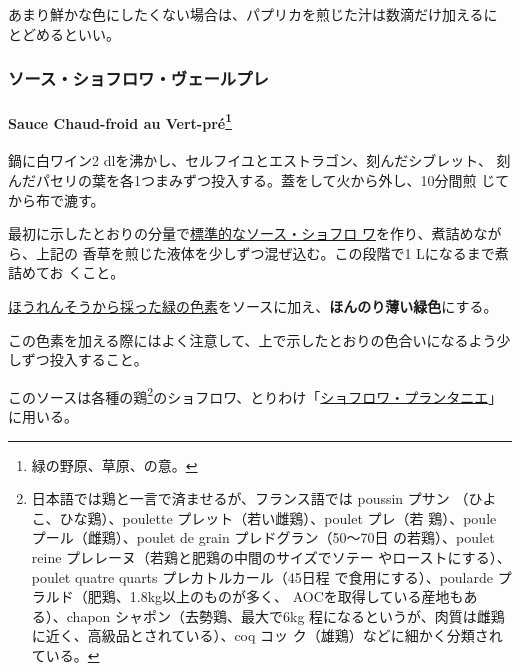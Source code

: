 \begin{recette}
あまり鮮かな色にしたくない場合は、パプリカを煎じた汁は数滴だけ加えるに
とどめるといい。

\maeaki

\hypertarget{ux30bdux30fcux30b9ux30b7ux30e7ux30d5ux30edux30efux30f4ux30a7ux30fcux30ebux30d7ux30ec}{%
\subsubsection{ソース・ショフロワ・ヴェールプレ}\label{ux30bdux30fcux30b9ux30b7ux30e7ux30d5ux30edux30efux30f4ux30a7ux30fcux30ebux30d7ux30ec}}

\hypertarget{sauce-choud-froid-vert-pre}{%
\paragraph[Sauce Chaud-froid au Vert-pré]{\texorpdfstring{Sauce
Chaud-froid au Vert-pré\footnote{緑の野原、草原、の意。}}{Sauce Chaud-froid au Vert-pré}}\label{sauce-choud-froid-vert-pre}}


鍋に白ワイン2 dlを沸かし、セルフイユとエストラゴン、刻んだシブレット、
刻んだパセリの葉を各1つまみずつ投入する。蓋をして火から外し、10分間煎
じてから布で漉す。

最初に示したとおりの分量で\protect\hyperlink{sauce-chaud-froid-blanche-ordinaire}{標準的なソース・ショフロ
ワ}を作り、煮詰めながら、上記の
香草を煎じた液体を少しずつ混ぜ込む。この段階で1 Lになるまで煮詰めてお
くこと。

\protect\hyperlink{}{ほうれんそうから採った緑の色素}をソースに加え、\textbf{ほんのり薄い緑色}にする。

この色素を加える際にはよく注意して、上で示したとおりの色合いになるよう少しずつ投入すること。

このソースは各種の鶏\footnote{日本語では鶏と一言で済ませるが、フランス語では
  poussin プサン （ひよこ、ひな鶏）、poulette
  プレット（若い雌鶏）、poulet プレ（若 鶏）、poule
  プール（雌鶏）、poulet de grain プレドグラン（50〜70日
  の若鶏）、poulet reine プレレーヌ（若鶏と肥鶏の中間のサイズでソテー
  やローストにする）、poulet quatre quarts プレカトルカール（45日程
  で食用にする）、poularde プラルド（肥鶏、1.8kg以上のものが多く、
  AOCを取得している産地もある）、chapon シャポン（去勢鶏、最大で6kg
  程になるというが、肉質は雌鶏に近く、高級品とされている）、coq コッ
  ク（雄鶏）などに細かく分類されている。}のショフロワ、とりわけ「\protect\hyperlink{}{ショフロワ・プランタニエ}」に用いる。


\end{recette}
